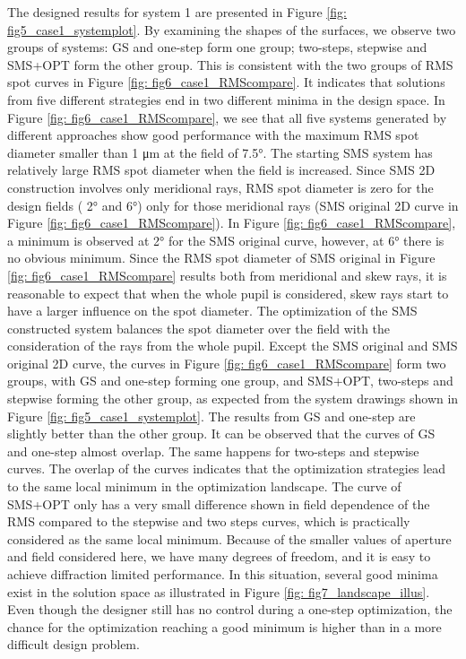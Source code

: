 The designed results for system 1 are presented in Figure \ref{fig: fig5_case1_systemplot}. By examining the shapes of the surfaces, we observe two groups of systems: GS and one-step form one group; two-steps, stepwise and SMS+OPT form the other group. This is consistent with the two groups of RMS spot curves in Figure \ref{fig: fig6_case1_RMScompare}. It indicates that solutions from five different strategies end in two different minima in the design space.
In Figure \ref{fig: fig6_case1_RMScompare}, we see that all five systems generated by different approaches show good performance with the maximum RMS spot diameter smaller than 1 μm at the field of 7.5°. The starting SMS system has relatively large RMS spot diameter when the field is increased. Since SMS 2D construction involves only meridional rays,  RMS spot diameter is zero for the design fields ( 2° and 6°) only for those meridional rays (SMS original 2D curve in Figure \ref{fig: fig6_case1_RMScompare}). In Figure \ref{fig: fig6_case1_RMScompare}, a minimum is observed at 2° for the SMS original curve, however, at 6° there is no obvious minimum. Since the RMS spot diameter of SMS original in Figure \ref{fig: fig6_case1_RMScompare} results both from meridional and skew rays, it is reasonable to expect that when the whole pupil is considered, skew rays start to have a larger influence on the spot diameter. The optimization of the SMS constructed system balances the spot diameter over the field with the consideration of the rays from the whole pupil. Except the SMS original and SMS original 2D curve, the curves in Figure \ref{fig: fig6_case1_RMScompare} form two groups, with GS and one-step forming one group, and SMS+OPT, two-steps and stepwise forming the other group, as expected from the system drawings shown in Figure \ref{fig: fig5_case1_systemplot}. The results from GS and one-step are slightly better than the other group.  It can be observed that the curves of GS and one-step almost overlap. The same happens for two-steps and stepwise curves. The overlap of the curves indicates that the optimization strategies lead to the same local minimum in the optimization landscape. The curve of SMS+OPT only has a very small difference shown in field dependence of the RMS compared to the stepwise and two steps curves, which is practically considered as the same local minimum. Because of the smaller values of aperture and field considered here, we have many degrees of freedom, and it is easy to achieve diffraction limited performance. In this situation, several good minima exist in the solution space as illustrated in Figure \ref{fig: fig7_landscape_illus}. Even though the designer still has no control during a one-step optimization, the chance for the optimization reaching a good minimum is higher than in a more difficult design problem.

